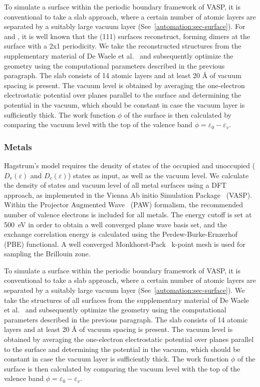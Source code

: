 \begin{refsection}
To simulate a surface within the periodic boundary framework of VASP, it is 
conventional to take a slab approach, where a certain number of atomic layers 
are separated by a suitably large vacuum layer (See~\ref{automation:sec-surface}). 
For  and , it is 
well known that the (111) surfaces reconstruct, forming dimers at the surface 
with a 2x1 periodicity. We take the reconstructed structures from the 
supplementary material of De Waele et al.~\cite{DeWaele2016} and subsequently 
optimize the geometry using the computational parameters described in the 
previous paragraph. The slab consists of 14 atomic layers and at least 20 
\si{\angstrom} of vacuum spacing is present. The vacuum level is obtained by 
averaging the one-electron electrostatic potential over planes parallel to the 
surface and determining the potential in the vacuum, which should be constant 
in case the vacuum layer is sufficiently thick. The work function $\phi$ of 
the surface is then calculated by comparing the vacuum level with the top of 
the valence band $\phi = \varepsilon_0 - \varepsilon_v$. 

\subsubsection{Metals} \label{appendix:sec-metals} 

Hagstrum's model requires the density of states of the occupied and unoccupied  
($D_v(\varepsilon)$ and $D_c(\varepsilon)$) states as input, as well as 
the vacuum level. We calculate the density of states and vacuum level of 
all metal surfaces using a DFT approach, as implemented in the 
Vienna Ab initio Simulation Package~\cite{Kresse1993, Kresse1994, Kresse1996, 
Kresse1996} (VASP). Within the Projector Augmented Wave~\cite{Blochl1994, 
Kresse1999} (PAW) formalism, the recommended number of valence electrons is 
included for all metals. The energy cutoff is set at 
500~\si{\electronvolt} in order to obtain a well converged plane wave basis 
set, and the exchange correlation energy is calculated using the 
Perdew-Burke-Ernzerhof~\cite{Perdew1996} (PBE) functional. A well converged 
Monkhorst-Pack~\cite{Monkhorst1976} k-point mesh is used for sampling the 
Brillouin zone.

To simulate a surface within the periodic boundary framework of VASP, it is 
conventional to take a slab approach, where a certain number of atomic layers 
are separated by a suitably large vacuum layer (See~\ref{automation:sec-surface}).
We take the structures of all surfaces from the 
supplementary material of De Waele et al.~\cite{DeWaele2016} and subsequently 
optimize the geometry using the computational parameters described in the 
previous paragraph. The slab consists of 14 atomic layers and at least 20 
\si{\angstrom} of vacuum spacing is present. The vacuum level is obtained by 
averaging the one-electron electrostatic potential over planes parallel to the 
surface and determining the potential in the vacuum, which should be constant 
in case the vacuum layer is sufficiently thick. The work function $\phi$ of 
the surface is then calculated by comparing the vacuum level with the top of 
the valence band $\phi = \varepsilon_0 - \varepsilon_v$. 


\end{refsection}
